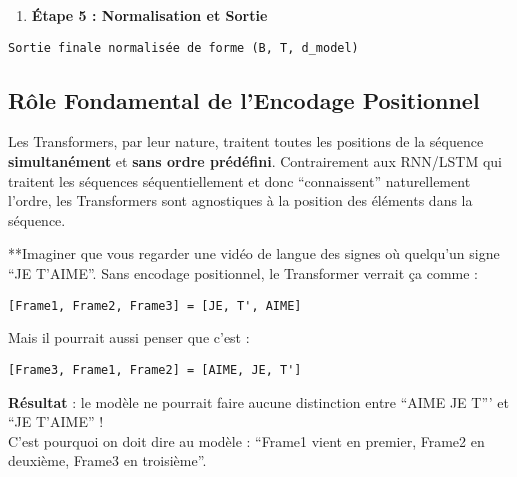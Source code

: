 \documentclass[12pt]{article}
\providecommand{\tightlist}{%
      \setlength{\itemsep}{0pt}\setlength{\parskip}{0pt}}
\begin{document}
\begin{enumerate}
\def\labelenumi{\arabic{enumi}.}
\setcounter{enumi}{4}
\tightlist
\item
  \textbf{Étape 5 : Normalisation et Sortie}
\end{enumerate}

\begin{verbatim}
Sortie finale normalisée de forme (B, T, d_model)
\end{verbatim}

    \subsection{Rôle Fondamental de l'Encodage
Positionnel}\label{ruxf4le-fondamental-de-lencodage-positionnel}

Les Transformers, par leur nature, traitent toutes les positions de la
séquence \textbf{simultanément} et \textbf{sans ordre prédéfini}.
Contrairement aux RNN/LSTM qui traitent les séquences séquentiellement
et donc ``connaissent'' naturellement l'ordre, les Transformers sont
agnostiques à la position des éléments dans la séquence.

**Imaginer que vous regarder une vidéo de langue des signes où quelqu'un
signe ``JE T'AIME''. Sans encodage positionnel, le Transformer verrait
ça comme :

\begin{verbatim}
[Frame1, Frame2, Frame3] = [JE, T', AIME]
\end{verbatim}

Mais il pourrait aussi penser que c'est :

\begin{verbatim}
[Frame3, Frame1, Frame2] = [AIME, JE, T']
\end{verbatim}

\textbf{Résultat} : le modèle ne pourrait faire aucune distinction entre
``AIME JE T''' et ``JE T'AIME'' !\\
C'est pourquoi on doit dire au modèle : ``Frame1 vient en premier,
Frame2 en deuxième, Frame3 en troisième''.
\end{document}
